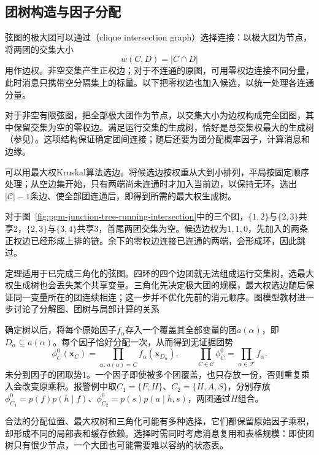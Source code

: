 \subsection{团树构造与因子分配}
\label{sec:pgm-junction-tree-spanning-tree}

弦图的极大团可以通过（clique intersection graph）选择连接：以极大团为节点，将两团的交集大小
\[
  w(C,D)=|C\cap D|
\]
用作边权。非空交集产生正权边；对于不连通的原图，可用零权边连接不同分量，此时消息只携带空分隔集上的标量。以下把零权边也加入候选，以统一处理各连通分量。

对于非空有限弦图，把全部极大团作为节点，以交集大小为边权构成完全团图，其中保留交集为空的零权边。满足运行交集的生成树，恰好是总交集权最大的生成树（参见）。这项结构保证确定团间连接；随后还要为团分配概率因子，计算消息和边缘。

可以用最大权Kruskal算法选边。将候选边按权重从大到小排列，平局按固定顺序处理；从空边集开始，只有两端尚未连通时才加入当前边，以保持无环。选出$|\mathcal C|-1$条边、使全部团连通后，即得到所需的最大权生成树。

对于图~\ref{fig:pgm-junction-tree-running-intersection}中的三个团，$\{1,2\}$与$\{2,3\}$共享$2$，$\{2,3\}$与$\{3,4\}$共享$3$，首尾两团交集为空。候选边权为$1,1,0$，先加入的两条正权边已经形成上排的链。余下的零权边连接已连通的两端，会形成环，因此跳过。

定理适用于已完成三角化的弦图。四环的四个边团就无法组成运行交集树，选最大权生成树也会丢失某个共享变量。三角化先决定极大团的规模，最大权选边随后保证同一变量所在的团连续相连；这一步并不优化先前的消元顺序。图模型教材进一步讨论了分解图、团树与局部计算的关系

确定树以后，将每个原始因子$f_\alpha$存入一个覆盖其全部变量的团$a(\alpha)$，即$D_\alpha\subseteq a(\alpha)$。每个因子恰好分配一次，从而得到无证据团势
\begin{equation}
  \phi_C^0(\bm{x}_C)
    =\prod_{\alpha:\,a(\alpha)=C}f_\alpha(\bm{x}_{D_\alpha}),
  \qquad
  \prod_{C\in\mathcal{C}}\phi_C^0
    =\prod_{\alpha\in\mathcal{F}}f_\alpha.
  \label{eq:pgm-junction-tree-factor-assignment}
\end{equation}
未分到因子的团取势$1$。一个因子即使被多个团覆盖，也只存放一份，否则重复乘入会改变原乘积。报警例中取$C_1=\{F,H\}$、$C_2=\{H,A,S\}$，分别存放$\phi_{C_1}^0=p(f)p(h\mid f)$、$\phi_{C_2}^0=p(s)p(a\mid h,s)$，两团通过$H$组合。

合法的分配位置、最大权树和三角化可能有多种选择，它们都保留原始因子乘积，却形成不同的局部表和缓存依赖。选择时需同时考虑消息复用和表格规模：即使团树只有很少节点，一个大团也可能需要难以容纳的状态表。

